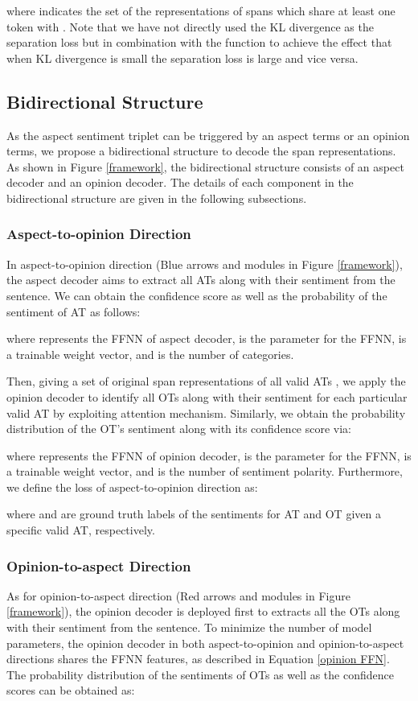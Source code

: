 \documentclass[11pt]{article}
\begin{document}
where  indicates the set of the representations of spans which share at least one token with . Note that we have not directly used the KL divergence as the separation loss but in combination with the  function to achieve the effect that when KL divergence is small the separation loss is large and vice versa.


\subsection{Bidirectional Structure} \label{BCS}
As the aspect sentiment triplet can be triggered by an aspect terms or an opinion terms, we propose a bidirectional structure to decode the span representations. As shown in Figure \ref{framework}, the bidirectional structure consists of an aspect decoder and an opinion decoder. The details of each component in the bidirectional structure are given in the following subsections.

\subsubsection{Aspect-to-opinion Direction}
In aspect-to-opinion direction (Blue arrows and modules in Figure \ref{framework}), the aspect decoder aims to extract all ATs along with their sentiment from the sentence. We can obtain the confidence score as well as the probability of the sentiment of AT as follows:



where  represents the FFNN of aspect decoder,  is the parameter for the FFNN,  is a trainable weight vector, and  is the number of categories. 

Then, giving a set  of original span representations of all valid ATs , we apply the opinion decoder to identify all OTs along with their sentiment for each particular valid AT by exploiting attention mechanism. Similarly, we obtain the probability distribution of the OT's sentiment along with its confidence score via:




where  represents the FFNN of opinion decoder,  is the parameter for the FFNN,  is a trainable weight vector, and  is the number of sentiment polarity. Furthermore, we define the loss of aspect-to-opinion direction as:

where  and  are ground truth labels of the sentiments for AT and OT given a specific valid AT, respectively.

\subsubsection{Opinion-to-aspect Direction}
As for opinion-to-aspect direction (Red arrows and modules in Figure \ref{framework}), the opinion decoder is deployed first to extracts all the OTs along with their sentiment from the sentence. To minimize the number of model parameters, the opinion decoder in both aspect-to-opinion and opinion-to-aspect directions shares the FFNN features, as described in Equation \eqref{opinion FFN}. The probability distribution of the sentiments of OTs as well as the confidence scores can be obtained as:
\end{document}
